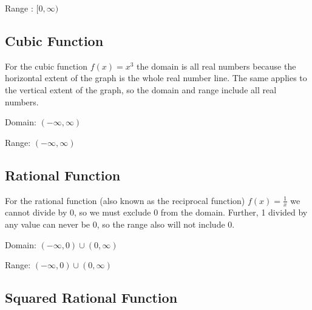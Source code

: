 Range : $[0 ,\infty )$




\subsection{Cubic Function}
\label{sss:cubi-6dd3}







For the cubic function $f(x) = x^3$ the domain is all real numbers because the horizontal
extent of the graph is the whole real number line. The same applies to the vertical extent
of the graph, so the domain and range include all real numbers.



Domain: $( -\infty ,\infty )$



Range: $( -\infty ,\infty )$




\subsection{Rational Function}
\label{sss:rati-42db}







For the rational function (also known as the reciprocal function) $f(x) = \frac{1}{x}$ we
cannot divide by 0, so we must exclude 0 from the domain. Further, 1 divided by any value
can never be 0, so the range also will not include 0.



Domain: $( -\infty , 0) \cup (0, \infty )$



Range: $( -\infty , 0) \cup (0, \infty )$




\subsection{Squared Rational Function}
\label{sss:squa-de87}




